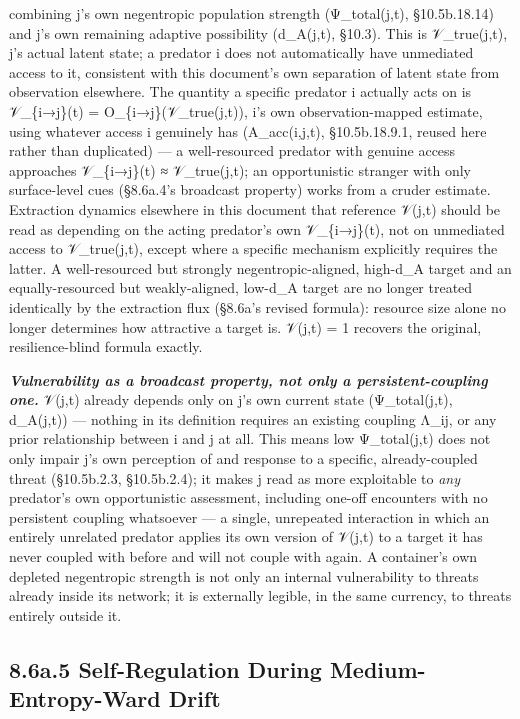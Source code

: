 \documentclass[
]{article}
\begin{document}
combining j's own negentropic population strength (Ψ\_total(j,t),
§10.5b.18.14) and j's own remaining adaptive possibility (d\_A(j,t),
§10.3). This is 𝒱\_true(j,t), j's actual latent state; a predator i does
not automatically have unmediated access to it, consistent with this
document's own separation of latent state from observation elsewhere.
The quantity a specific predator i actually acts on is 𝒱\_\{i→j\}(t) =
O\_\{i→j\}(𝒱\_true(j,t)), i's own observation-mapped estimate, using
whatever access i genuinely has (A\_acc(i,j,t), §10.5b.18.9.1, reused
here rather than duplicated) --- a well-resourced predator with genuine
access approaches 𝒱\_\{i→j\}(t) ≈ 𝒱\_true(j,t); an opportunistic
stranger with only surface-level cues (§8.6a.4's broadcast property)
works from a cruder estimate. Extraction dynamics elsewhere in this
document that reference 𝒱(j,t) should be read as depending on the acting
predator's own 𝒱\_\{i→j\}(t), not on unmediated access to 𝒱\_true(j,t),
except where a specific mechanism explicitly requires the latter. A
well-resourced but strongly negentropic-aligned, high-d\_A target and an
equally-resourced but weakly-aligned, low-d\_A target are no longer
treated identically by the extraction flux (§8.6a's revised formula):
resource size alone no longer determines how attractive a target is.
𝒱(j,t) = 1 recovers the original, resilience-blind formula exactly.

\emph{\textbf{Vulnerability as a broadcast property, not only a
persistent-coupling one.}} 𝒱(j,t) already depends only on j's own
current state (Ψ\_total(j,t), d\_A(j,t)) --- nothing in its definition
requires an existing coupling Λ\_ij, or any prior relationship between i
and j at all. This means low Ψ\_total(j,t) does not only impair j's own
perception of and response to a specific, already-coupled threat
(§10.5b.2.3, §10.5b.2.4); it makes j read as more exploitable to
\emph{any} predator's own opportunistic assessment, including one-off
encounters with no persistent coupling whatsoever --- a single,
unrepeated interaction in which an entirely unrelated predator applies
its own version of 𝒱(j,t) to a target it has never coupled with before
and will not couple with again. A container's own depleted negentropic
strength is not only an internal vulnerability to threats already inside
its network; it is externally legible, in the same currency, to threats
entirely outside it.

\hypertarget{a.5-self-regulation-during-medium-entropy-ward-drift}{%
\subsection{8.6a.5 Self-Regulation During Medium-Entropy-Ward
Drift}\label{a.5-self-regulation-during-medium-entropy-ward-drift}}
\end{document}
